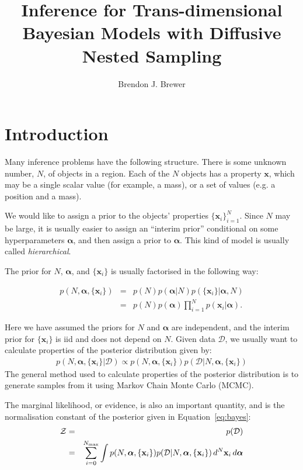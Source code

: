 \documentclass[letterpaper, 11pt]{article}
\title{Inference for Trans-dimensional Bayesian Models with Diffusive Nested
Sampling}
\author{Brendon J. Brewer}
\newcommand{\hyperparams}{\boldsymbol{\alpha}}
\newcommand{\xx}{\mathbf{x}}
\begin{document}
\maketitle
{}

\section{Introduction}\label{sec:introduction}
\setlength{\parindent}{0cm}
\setlength{\parskip}{3mm}
Many inference problems have the following structure. There is some unknown
number, $N$, of objects in a region. Each of the $N$ objects has a property
$\xx$, which may be a single scalar value (for example, a mass), or a set of
values (e.g. a position and a mass).

We would like to assign a prior to the objects' properties $\{\xx_i\}_{i=1}^N$.
Since $N$ may be large, it is usually easier to assign an ``interim prior''
conditional on some hyperparameters $\hyperparams$, and then assign a prior to
$\hyperparams$. This kind of model is usually called {\it hierarchical}.

The prior for $N$, $\hyperparams$, and $\{\xx_i\}$ is usually factorised
in the following way:

\begin{eqnarray}
p(N, \hyperparams, \{\xx_i\}) &=& p(N) p(\hyperparams | N) p(\{\xx_i\} | \hyperparams, N) \\
&=& p(N) p(\hyperparams) \prod_{i=1}^N p(\xx_i | \hyperparams).
\end{eqnarray}

Here we have assumed the priors for $N$ and $\hyperparams$ are independent, and
the interim prior for $\{\xx_i\}$ is iid and does not depend on $N$.
Given data $\mathcal{D}$, we usually want to calculate properties of the
posterior distribution given by:
\begin{eqnarray}
p(N, \hyperparams, \{\xx_i\} | \mathcal{D}) \propto
p(N, \hyperparams, \{\xx_i\})
p(\mathcal{D} | N, \hyperparams, \{\xx_i\})\label{eq:bayes}
\end{eqnarray}
The general method used to calculate properties of the posterior distribution
is to generate samples from it using Markov Chain Monte Carlo (MCMC).

The marginal likelihood, or evidence, is also an important quantity, and is
the normalisation constant of the posterior given in Equation~\ref{eq:bayes}:
\begin{eqnarray}
\mathcal{Z} &=& p(\mathcal{D})\\
&=& \sum_{i=0}^{N_{\rm max}} \int
p(N, \hyperparams, \{\xx_i\})p(\mathcal{D} | N, \hyperparams, \{\xx_i\})
\, d^N \xx_i \, d\hyperparams \label{eq:evidence}
\end{eqnarray}
\end{document}
